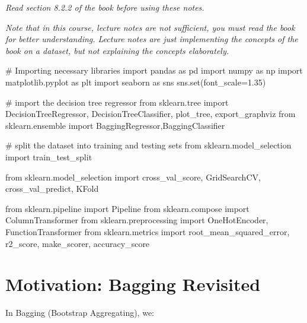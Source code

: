 \documentclass[
  letterpaper,
  DIV=11,
  numbers=noendperiod]{scrreprt}
\newenvironment{Shaded}{\begin{snugshade}}{\end{snugshade}}
\newcommand{\BuiltInTok}[1]{\textcolor[rgb]{0.00,0.23,0.31}{#1}}
\newcommand{\CommentTok}[1]{\textcolor[rgb]{0.37,0.37,0.37}{#1}}
\newcommand{\FloatTok}[1]{\textcolor[rgb]{0.68,0.00,0.00}{#1}}
\newcommand{\ImportTok}[1]{\textcolor[rgb]{0.00,0.46,0.62}{#1}}
\newcommand{\NormalTok}[1]{\textcolor[rgb]{0.00,0.23,0.31}{#1}}
\newcommand{\OperatorTok}[1]{\textcolor[rgb]{0.37,0.37,0.37}{#1}}
\begin{document}
\emph{Read section 8.2.2 of the book before using these notes.}

\emph{Note that in this course, lecture notes are not sufficient, you
must read the book for better understanding. Lecture notes are just
implementing the concepts of the book on a dataset, but not explaining
the concepts elaborately.}

\begin{Shaded}
\begin{Highlighting}[]
\CommentTok{\# Importing necessary libraries}
\ImportTok{import}\NormalTok{ pandas }\ImportTok{as}\NormalTok{ pd}
\ImportTok{import}\NormalTok{ numpy }\ImportTok{as}\NormalTok{ np}
\ImportTok{import}\NormalTok{ matplotlib.pyplot }\ImportTok{as}\NormalTok{ plt}
\ImportTok{import}\NormalTok{ seaborn }\ImportTok{as}\NormalTok{ sns}
\NormalTok{sns.}\BuiltInTok{set}\NormalTok{(font\_scale}\OperatorTok{=}\FloatTok{1.35}\NormalTok{)}

\CommentTok{\# import the decision tree regressor}
\ImportTok{from}\NormalTok{ sklearn.tree }\ImportTok{import}\NormalTok{ DecisionTreeRegressor, DecisionTreeClassifier, plot\_tree, export\_graphviz}
\ImportTok{from}\NormalTok{ sklearn.ensemble }\ImportTok{import}\NormalTok{ BaggingRegressor,BaggingClassifier}

\CommentTok{\# split the dataset into training and testing sets}
\ImportTok{from}\NormalTok{ sklearn.model\_selection }\ImportTok{import}\NormalTok{ train\_test\_split}


\ImportTok{from}\NormalTok{ sklearn.model\_selection }\ImportTok{import}\NormalTok{ cross\_val\_score, GridSearchCV, cross\_val\_predict, KFold}

\ImportTok{from}\NormalTok{ sklearn.pipeline }\ImportTok{import}\NormalTok{ Pipeline}
\ImportTok{from}\NormalTok{ sklearn.compose }\ImportTok{import}\NormalTok{ ColumnTransformer}
\ImportTok{from}\NormalTok{ sklearn.preprocessing }\ImportTok{import}\NormalTok{ OneHotEncoder, FunctionTransformer}
\ImportTok{from}\NormalTok{ sklearn.metrics }\ImportTok{import}\NormalTok{ root\_mean\_squared\_error, r2\_score, make\_scorer, accuracy\_score}
\end{Highlighting}
\end{Shaded}

\section{Motivation: Bagging
Revisited}\label{motivation-bagging-revisited}

In Bagging (Bootstrap Aggregating), we:
\end{document}
